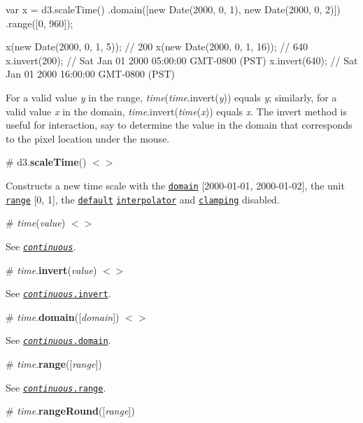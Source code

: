 \begin{DoxyCode}
var x = d3.scaleTime()
    .domain([new Date(2000, 0, 1), new Date(2000, 0, 2)])
    .range([0, 960]);

x(new Date(2000, 0, 1,  5)); // 200
x(new Date(2000, 0, 1, 16)); // 640
x.invert(200); // Sat Jan 01 2000 05:00:00 GMT-0800 (PST)
x.invert(640); // Sat Jan 01 2000 16:00:00 GMT-0800 (PST)
\end{DoxyCode}


For a valid value {\itshape y} in the range, {\itshape time}({\itshape time}.invert({\itshape y})) equals {\itshape y}; similarly, for a valid value {\itshape x} in the domain, {\itshape time}.invert({\itshape time}({\itshape x})) equals {\itshape x}. The invert method is useful for interaction, say to determine the value in the domain that corresponds to the pixel location under the mouse.

\label{_scaleTime}%
\# d3.{\bfseries scale\+Time}() \href{https://github.com/d3/d3-scale/blob/master/src/time.js}{\tt $<$$>$}

Constructs a new time scale with the \href{#time_domain}{\tt domain} \mbox{[}2000-\/01-\/01, 2000-\/01-\/02\mbox{]}, the unit \href{#time_range}{\tt range} \mbox{[}0, 1\mbox{]}, the \href{https://github.com/d3/d3-interpolate#interpolate}{\tt default} \href{#time_interpolate}{\tt interpolator} and \href{#time_clamp}{\tt clamping} disabled.

\label{_time}%
\# {\itshape time}({\itshape value}) \href{https://github.com/d3/d3-scale/blob/master/src/time.js#L133}{\tt $<$$>$}

See \href{#_continuous}{\tt {\itshape continuous}}.

\label{_time_invert}%
\# {\itshape time}.{\bfseries invert}({\itshape value}) \href{https://github.com/d3/d3-scale/blob/master/src/time.js#L95}{\tt $<$$>$}

See \href{#continuous_invert}{\tt {\itshape continuous}.invert}.

\label{_time_domain}%
\# {\itshape time}.{\bfseries domain}(\mbox{[}{\itshape domain}\mbox{]}) \href{https://github.com/d3/d3-scale/blob/master/src/time.js#L99}{\tt $<$$>$}

See \href{#continuous_domain}{\tt {\itshape continuous}.domain}.

\label{_time_range}%
\# {\itshape time}.{\bfseries range}(\mbox{[}{\itshape range}\mbox{]})

See \href{#continuous_range}{\tt {\itshape continuous}.range}.

\label{_time_rangeRound}%
\# {\itshape time}.{\bfseries range\+Round}(\mbox{[}{\itshape range}\mbox{]})

